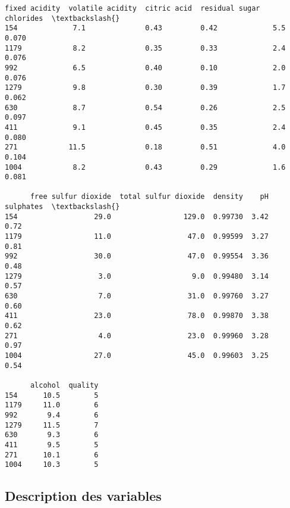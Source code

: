 \documentclass[11pt]{article}
\makeatletter
\newcommand{\boxspacing}{\kern\kvtcb@left@rule\kern\kvtcb@boxsep}
\newcommand{\prompt}[4]{
        {\ttfamily\llap{{\color{#2}[#3]:\hspace{3pt}#4}}\vspace{-\baselineskip}}
    }
\makeatother
\begin{document}
            \begin{tcolorbox}[breakable, size=fbox, boxrule=.5pt, pad at break*=1mm, opacityfill=0]
\prompt{Out}{outcolor}{1}{\boxspacing}
\begin{Verbatim}[commandchars=\\\{\}]
      fixed acidity  volatile acidity  citric acid  residual sugar  chlorides  \textbackslash{}
154             7.1              0.43         0.42             5.5      0.070
1179            8.2              0.35         0.33             2.4      0.076
992             6.5              0.40         0.10             2.0      0.076
1279            9.8              0.30         0.39             1.7      0.062
630             8.7              0.54         0.26             2.5      0.097
411             9.1              0.45         0.35             2.4      0.080
271            11.5              0.18         0.51             4.0      0.104
1004            8.2              0.43         0.29             1.6      0.081

      free sulfur dioxide  total sulfur dioxide  density    pH  sulphates  \textbackslash{}
154                  29.0                 129.0  0.99730  3.42       0.72
1179                 11.0                  47.0  0.99599  3.27       0.81
992                  30.0                  47.0  0.99554  3.36       0.48
1279                  3.0                   9.0  0.99480  3.14       0.57
630                   7.0                  31.0  0.99760  3.27       0.60
411                  23.0                  78.0  0.99870  3.38       0.62
271                   4.0                  23.0  0.99960  3.28       0.97
1004                 27.0                  45.0  0.99603  3.25       0.54

      alcohol  quality
154      10.5        5
1179     11.0        6
992       9.4        6
1279     11.5        7
630       9.3        6
411       9.5        5
271      10.1        6
1004     10.3        5
\end{Verbatim}
\end{tcolorbox}
        
    \hypertarget{description-des-variables}{%
\subsection{Description des variables}\label{description-des-variables}}
\end{document}
